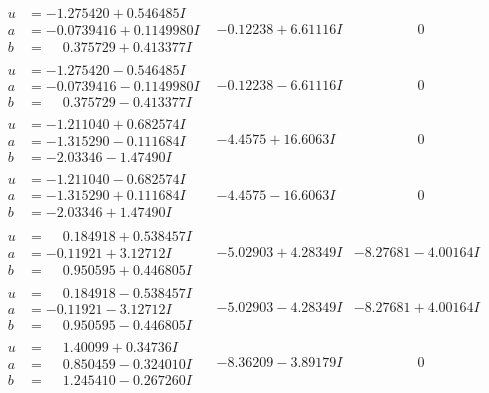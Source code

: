 \documentclass[1p]{elsarticle_modified}
\theoremstyle{definition}
\begin{document}
$$\begin{array}{c|c|c}
\begin{aligned}
u &= -1.275420 + 0.546485 I \\
a &= -0.0739416 + 0.1149980 I \\
b &= \phantom{-}0.375729 + 0.413377 I\end{aligned}
 & -0.12238 + 6.61116 I & \phantom{-0.000000 } 0 \\ \hline\begin{aligned}
u &= -1.275420 - 0.546485 I \\
a &= -0.0739416 - 0.1149980 I \\
b &= \phantom{-}0.375729 - 0.413377 I\end{aligned}
 & -0.12238 - 6.61116 I & \phantom{-0.000000 } 0 \\ \hline\begin{aligned}
u &= -1.211040 + 0.682574 I \\
a &= -1.315290 - 0.111684 I \\
b &= -2.03346 - 1.47490 I\end{aligned}
 & -4.4575 + 16.6063 I & \phantom{-0.000000 } 0 \\ \hline\begin{aligned}
u &= -1.211040 - 0.682574 I \\
a &= -1.315290 + 0.111684 I \\
b &= -2.03346 + 1.47490 I\end{aligned}
 & -4.4575 - 16.6063 I & \phantom{-0.000000 } 0 \\ \hline\begin{aligned}
u &= \phantom{-}0.184918 + 0.538457 I \\
a &= -0.11921 + 3.12712 I \\
b &= \phantom{-}0.950595 + 0.446805 I\end{aligned}
 & -5.02903 + 4.28349 I & -8.27681 - 4.00164 I \\ \hline\begin{aligned}
u &= \phantom{-}0.184918 - 0.538457 I \\
a &= -0.11921 - 3.12712 I \\
b &= \phantom{-}0.950595 - 0.446805 I\end{aligned}
 & -5.02903 - 4.28349 I & -8.27681 + 4.00164 I \\ \hline\begin{aligned}
u &= \phantom{-}1.40099 + 0.34736 I \\
a &= \phantom{-}0.850459 - 0.324010 I \\
b &= \phantom{-}1.245410 - 0.267260 I\end{aligned}
 & -8.36209 - 3.89179 I & \phantom{-0.000000 } 0\\

\end{array}$$
\end{document}
